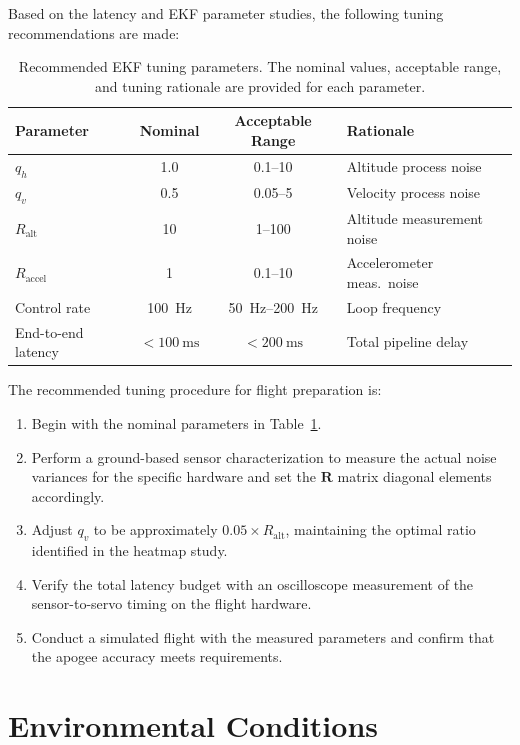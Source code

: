 \documentclass[11pt,letterpaper]{article}
\begin{document}
Based on the latency and EKF parameter studies, the following tuning recommendations are made:

\begin{table}[H]
    \centering
    \caption{Recommended EKF tuning parameters. The nominal values, acceptable range, and tuning rationale are provided for each parameter.}
    \label{tab:ekf_tuning}
    \begin{tabular}{lccl}
        \toprule
        \textbf{Parameter} & \textbf{Nominal} & \textbf{Acceptable Range} & \textbf{Rationale} \\
        \midrule
        $q_h$ & 1.0 & 0.1--10 & Altitude process noise \\
        $q_v$ & 0.5 & 0.05--5 & Velocity process noise \\
        $R_{\text{alt}}$ & 10 & 1--100 & Altitude measurement noise \\
        $R_{\text{accel}}$ & 1 & 0.1--10 & Accelerometer meas.\ noise \\
        Control rate & \SI{100}{\hertz} & \SI{50}{\hertz}--\SI{200}{\hertz} & Loop frequency \\
        End-to-end latency & $<\SI{100}{\milli\second}$ & $<\SI{200}{\milli\second}$ & Total pipeline delay \\
        \bottomrule
    \end{tabular}
\end{table}

The recommended tuning procedure for flight preparation is:
\begin{enumerate}[nosep]
    \item Begin with the nominal parameters in Table~\ref{tab:ekf_tuning}.
    \item Perform a ground-based sensor characterization to measure the actual noise variances for the specific hardware and set the $\mathbf{R}$ matrix diagonal elements accordingly.
    \item Adjust $q_v$ to be approximately $0.05 \times R_{\text{alt}}$, maintaining the optimal ratio identified in the heatmap study.
    \item Verify the total latency budget with an oscilloscope measurement of the sensor-to-servo timing on the flight hardware.
    \item Conduct a simulated flight with the measured parameters and confirm that the apogee accuracy meets requirements.
\end{enumerate}


\section{Environmental Conditions}
\label{sec:environment}
\end{document}
